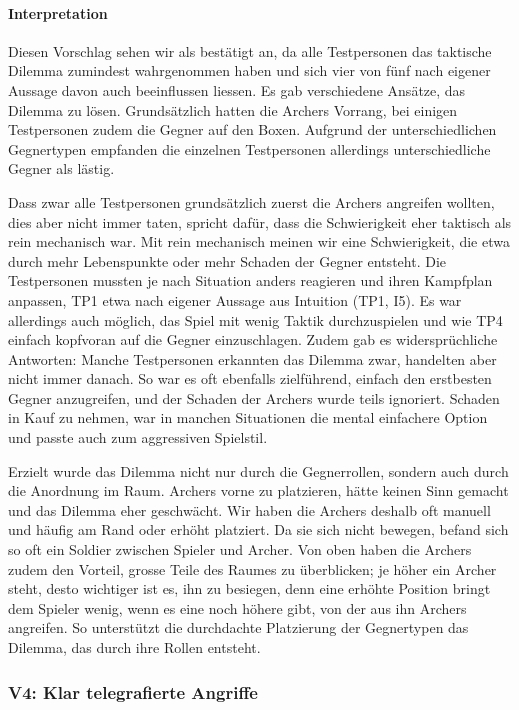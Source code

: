 \documentclass[../Main.tex]{subfiles}
\begin{document}
\paragraph{Interpretation}
Diesen Vorschlag sehen wir als bestätigt an, da alle Testpersonen das taktische Dilemma zumindest wahrgenommen haben und sich vier von fünf nach eigener Aussage davon auch beeinflussen liessen. Es gab verschiedene Ansätze, das Dilemma zu lösen. Grundsätzlich hatten die Archers Vorrang, bei einigen Testpersonen zudem die Gegner auf den Boxen. Aufgrund der unterschiedlichen Gegnertypen empfanden die einzelnen Testpersonen allerdings unterschiedliche Gegner als lästig.

Dass zwar alle Testpersonen grundsätzlich zuerst die Archers angreifen wollten, dies aber nicht immer taten, spricht dafür, dass die Schwierigkeit eher taktisch als rein mechanisch war. Mit rein mechanisch meinen wir eine Schwierigkeit, die etwa durch mehr Lebenspunkte oder mehr Schaden der Gegner entsteht. Die Testpersonen mussten je nach Situation anders reagieren und ihren Kampfplan anpassen, TP1 etwa nach eigener Aussage aus Intuition (TP1, I5). Es war allerdings auch möglich, das Spiel mit wenig Taktik durchzuspielen und wie TP4 einfach kopfvoran auf die Gegner einzuschlagen. Zudem gab es widersprüchliche Antworten: Manche Testpersonen erkannten das Dilemma zwar, handelten aber nicht immer danach. So war es oft ebenfalls zielführend, einfach den erstbesten Gegner anzugreifen, und der Schaden der Archers wurde teils ignoriert. Schaden in Kauf zu nehmen, war in manchen Situationen die mental einfachere Option und passte auch zum aggressiven Spielstil.

Erzielt wurde das Dilemma nicht nur durch die Gegnerrollen, sondern auch durch die Anordnung im Raum. Archers vorne zu platzieren, hätte keinen Sinn gemacht und das Dilemma eher geschwächt. Wir haben die Archers deshalb oft manuell und häufig am Rand oder erhöht platziert. Da sie sich nicht bewegen, befand sich so oft ein Soldier zwischen Spieler und Archer. Von oben haben die Archers zudem den Vorteil, grosse Teile des Raumes zu überblicken; je höher ein Archer steht, desto wichtiger ist es, ihn zu besiegen, denn eine erhöhte Position bringt dem Spieler wenig, wenn es eine noch höhere gibt, von der aus ihn Archers angreifen. So unterstützt die durchdachte Platzierung der Gegnertypen das Dilemma, das durch ihre Rollen entsteht.

\subsubsection{V4: Klar telegrafierte Angriffe}
\end{document}
